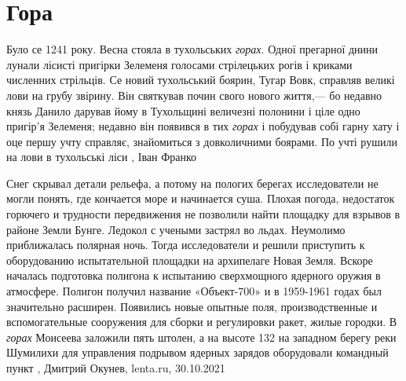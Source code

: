  
 
 
 
 
\chapter{Гора}

Було се 1241 року. Весна стояла в тухольських \emph{горах}.  Одної прегарної
днини лунали лісисті пригірки Зелеменя голосами стрілецьких рогів і криками
численних стрільців.  Се новий тухольський боярин, Тугар Вовк, справляв великі
лови на грубу звірину. Він святкував почин свого нового життя,— бо недавно
князь Данило дарував йому в Тухольщині величезні полонини і ціле одно пригір'я
Зелеменя; недавно він появився в тих \emph{горах} і побудував собі гарну хату і
оце першу учту справляє, знайомиться з довколичними боярами. По учті рушили на
лови в тухольські ліси
, Іван Франко

Снег скрывал детали рельефа, а потому на пологих берегах исследователи не могли
понять, где кончается море и начинается суша. Плохая погода, недостаток
горючего и трудности передвижения не позволили найти площадку для взрывов в
районе Земли Бунге. Ледокол с учеными застрял во льдах. Неумолимо приближалась
полярная ночь.  Тогда исследователи и решили приступить к оборудованию
испытательной площадки на архипелаге Новая Земля. Вскоре началась подготовка
полигона к испытанию сверхмощного ядерного оружия в атмосфере. Полигон получил
название «Объект-700» и в 1959-1961 годах был значительно расширен. Появились
новые опытные поля, производственные и вспомогательные сооружения для сборки и
регулировки ракет, жилые городки.  В \emph{горах} Моисеева заложили пять штолен, а на
высоте 132 на западном берегу реки Шумилихи для управления подрывом ядерных
зарядов оборудовали командный пункт
, Дмитрий Окунев, lenta.ru, 30.10.2021
